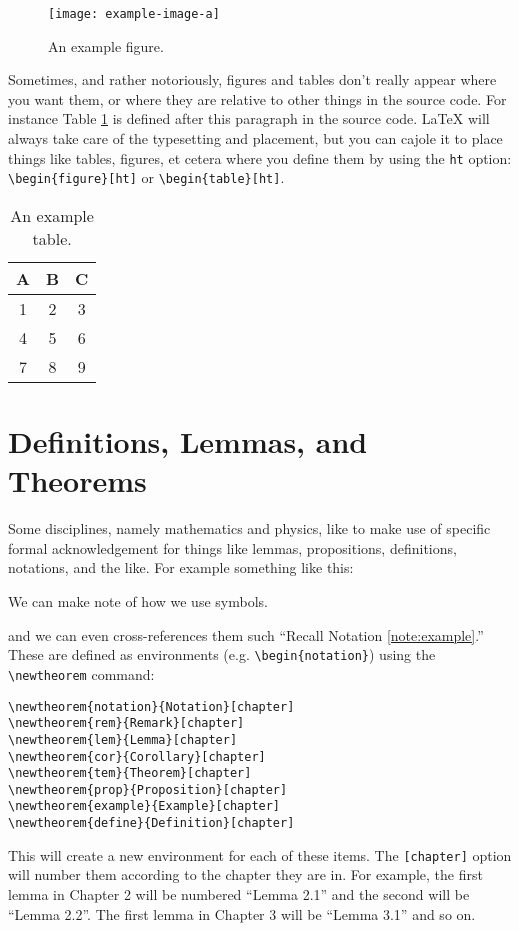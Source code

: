 \documentclass{thesis-dissertation}
\begin{document}
\begin{figure}[ht]
  \centering
  \texttt{[image: example-image-a]}
  \caption{An example figure.}
  \label{fig:example-image-a}
\end{figure}

Sometimes, and rather notoriously, figures and tables don't really appear where you want them, or where they are relative to other things in the source code. For instance Table \ref{tab:example-table} is defined after this paragraph in the source code. \LaTeX{} will always take care of the typesetting and placement, but you can cajole it to place things like tables, figures, et cetera where you define them by using the \texttt{ht} option: \verb|\begin{figure}[ht]| or \verb|\begin{table}[ht]|.
 \begin{table}
  \centering
  \begin{tabular}{|c|c|c|} %
    \hline
    A & B & C \\
    \hline
    1 & 2 & 3 \\
    4 & 5 & 6 \\
    7 & 8 & 9 \\
    \hline
  \end{tabular}
  \caption{An example table.}
  \label{tab:example-table}
\end{table}

\section{Definitions, Lemmas, and Theorems}
Some disciplines, namely mathematics and physics, like to make use of specific formal acknowledgement for things like lemmas, propositions, definitions, notations, and the like. For example something like this: \begin{notation} We can make note of how we use symbols. \label{note:example}\end{notation} and we can even cross-references them such ``Recall Notation \ref{note:example}.'' These are defined as environments (e.g. \verb|\begin{notation}|) using the \verb|\newtheorem| command: \begin{singlespace}
\begin{verbatim}
\newtheorem{notation}{Notation}[chapter]
\newtheorem{rem}{Remark}[chapter]
\newtheorem{lem}{Lemma}[chapter]
\newtheorem{cor}{Corollary}[chapter]
\newtheorem{tem}{Theorem}[chapter]
\newtheorem{prop}{Proposition}[chapter]
\newtheorem{example}{Example}[chapter]
\newtheorem{define}{Definition}[chapter]
\end{verbatim}
\end{singlespace} This will create a new environment for each of these items. The \verb|[chapter]| option will number them according to the chapter they are in. For example, the first lemma in Chapter 2 will be numbered ``Lemma 2.1'' and the second will be ``Lemma 2.2''. The first lemma in Chapter 3 will be ``Lemma 3.1'' and so on.
\end{document}
